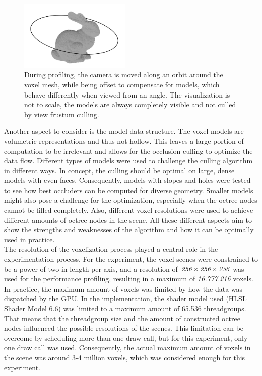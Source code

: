 \begin{figure}[h]
    \centering
    \includegraphics[width=200px]{images/graphics/test-anim-camera-path.jpg}
    \caption{During profiling, the camera is moved along an orbit around the voxel mesh, while being offset to compensate 
    for models, which behave differently when viewed from an angle. The visualization is not to scale, the models 
    are always completely visible and not culled by view frustum culling.}
    \label{fig:test-anim-camera-path}
\end{figure}

Another aspect to consider is the model data structure. The voxel models are volumetric representations and thus 
not hollow. This leaves a large portion of computation to be irrelevant and allows for the occlusion culling to 
optimize the data flow. Different types of models were used to challenge the culling algorithm in different ways. 
In concept, the culling should be optimal on large, dense models with even faces. Consequently, models with 
slopes and holes were tested to see how best occluders can be computed for diverse geometry. Smaller models might 
also pose a challenge for the optimization, especially when the octree nodes cannot be filled completely. Also, 
different voxel resolutions were used to achieve different amounts of octree nodes in the scene. All these different 
aspects aim to show the strengths and weaknesses of the algorithm and how it can be optimally used in practice. \\

\noindent
The resolution of the voxelization process played a central role in the experimentation process.
For the experiment, the voxel scenes were constrained to be a power of two in length per axis, and a resolution 
of $\emph{256} \times \emph{256} \times \emph{256}$ was used for the performance profiling, resulting in a maximum 
of \emph{16.777.216} voxels. In practice, the maximum amount of voxels was limited by how the data was dispatched 
by the \ac{GPU}. In the implementation, the shader model used (HLSL Shader Model 6.6) was limited to a maximum 
amount of 65.536 threadgroups. That means that the threadgroup size and the amount of constructed octree nodes 
influenced the possible resolutions of the scenes. This limitation can be overcome by scheduling more than one draw 
call, but for this experiment, only one draw call was used. Consequently, the actual maximum amount of voxels in the 
scene was around 3-4 million voxels, which was considered enough for this experiment. \\

